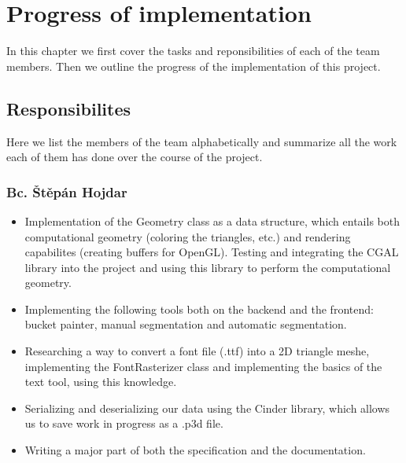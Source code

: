 \chapter{Progress of implementation}

In this chapter we first cover the tasks and reponsibilities of each of the team members. Then we outline the progress of the implementation of this project.

\section{Responsibilites}
\label{sec:responsibilites}

Here we list the members of the team alphabetically and summarize all the work each of them has done over the course of the project.

\subsection{Bc. Štěpán Hojdar}
\begin{itemize}
\item Implementation of the Geometry class as a data structure, which entails both computational geometry (coloring the triangles, etc.) and rendering capabilites (creating buffers for OpenGL). Testing and integrating the CGAL library into the project and using this library to perform the computational geometry.
\item Implementing the following tools both on the backend and the frontend: bucket painter, manual segmentation and automatic segmentation.
\item Researching a way to convert a font file (.ttf) into a 2D triangle meshe, implementing the FontRasterizer class and implementing the basics of the text tool, using this knowledge.
\item Serializing and deserializing our data using the Cinder library, which allows us to save work in progress as a .p3d file.
\item Writing a major part of both the specification and the documentation.
\end{itemize}

